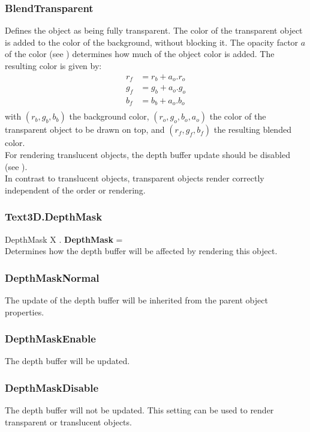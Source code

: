 \subsubsection{BlendTransparent \label{T:BlendType|BlendTransparent}}
Defines the object as being fully transparent. The color of the transparent object is added to the color of the background, without blocking it. The opacity factor $a$ of the color (see ) determines how much of the object color is added. The resulting color is given by:
\begin{equation}
\begin{array}{rcl}
r_f & = r_b + a_o . r_o \\
g_f & = g_b + a_o . g_o \\
b_f & = b_b + a_o . b_o \\
\end{array}
\end{equation}
with $(r_b,g_b,b_b)$ the background color, $(r_o,g_o,b_o,a_o)$ the color of the transparent object to be drawn on top, and $(r_f,g_f,b_f)$ the resulting blended color. \\
For rendering translucent objects, the depth buffer update should be disabled (see ). \\
In contrast to translucent objects, transparent objects render correctly independent of the order or rendering.

\subsubsection{Text3D.DepthMask \label{F:Text3D:DepthMask}}
DepthMask X . \textbf{DepthMask} = \\
Determines how the depth buffer will be affected by rendering this object.

\subsubsection{DepthMaskNormal \label{T:DepthMask|DepthMaskNormal}}
The update of the depth buffer will be inherited from the parent object properties.

\subsubsection{DepthMaskEnable \label{T:DepthMask|DepthMaskEnable}}
The depth buffer will be updated.

\subsubsection{DepthMaskDisable \label{T:DepthMask|DepthMaskDisable}}
The depth buffer will not be updated. This setting can be used to render transparent or translucent objects.

